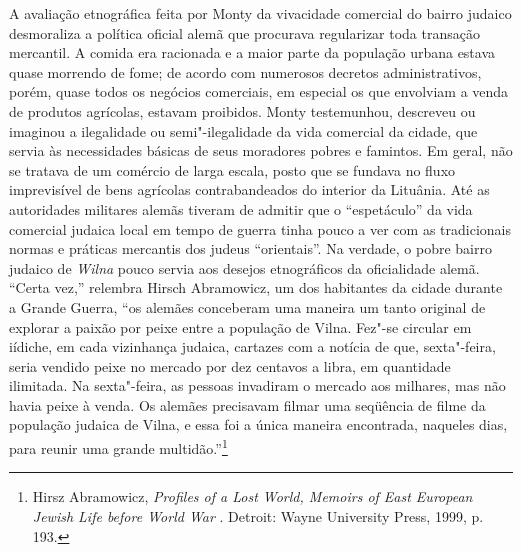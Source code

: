A avaliação etnográfica feita por Monty da vivacidade comercial do
bairro judaico desmoraliza a política oficial alemã que procurava
regularizar toda transação mercantil. A comida era racionada e a maior
parte da população urbana estava quase morrendo de fome; de acordo com
numerosos decretos administrativos, porém, quase todos os negócios
comerciais, em especial os que envolviam a venda de produtos agrícolas,
estavam proibidos. Monty testemunhou, descreveu ou imaginou a
ilegalidade ou semi"-ilegalidade da vida comercial da cidade, que servia
às necessidades básicas de seus moradores pobres e famintos. Em geral,
não se tratava de um comércio de larga escala, posto que se fundava no
fluxo imprevisível de bens agrícolas contrabandeados do interior da
Lituânia. Até as autoridades militares alemãs tiveram de admitir que o
``espetáculo'' da vida comercial judaica local em tempo de guerra tinha
pouco a ver com as tradicionais normas e práticas mercantis dos judeus
``orientais''. Na verdade, o pobre bairro judaico de \textit{Wilna} pouco servia
aos desejos etnográficos da oficialidade alemã. ``Certa vez,'' relembra
Hirsch Abramowicz, um dos habitantes da cidade durante a Grande Guerra,
``os alemães conceberam uma maneira um tanto original de explorar a
paixão por peixe entre a população de Vilna. Fez"-se circular em iídiche,
em cada vizinhança judaica, cartazes com a notícia de que, sexta"-feira,
seria vendido peixe no mercado por dez centavos a libra, em quantidade
ilimitada. Na sexta"-feira, as pessoas invadiram o mercado aos milhares,
mas não havia peixe à venda. Os alemães precisavam filmar uma seqüência
de filme da população judaica de Vilna, e essa foi a única maneira
encontrada, naqueles dias, para reunir uma grande multidão.''\footnote{Hirsz Abramowicz, \textit{Profiles of a Lost World, Memoirs of East European Jewish Life before World War }. Detroit: Wayne University Press, 1999, p. 193.}

